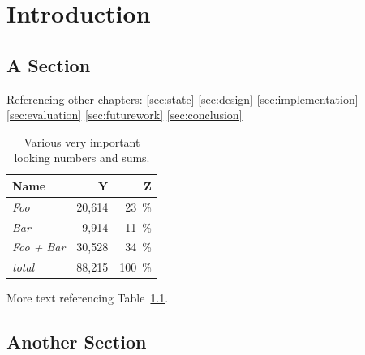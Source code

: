 \chapter{Introduction}
\label{sec:intro}





\section{A Section}

Referencing other chapters: \ref{sec:state} \ref{sec:design}
\ref{sec:implementation} \ref{sec:evaluation} \ref{sec:futurework}
\ref{sec:conclusion}

\begin{table}[htp]
  \centering
  \begin{tabular}{lrr}
    \textbf{Name} & \textbf{Y} & \textbf{Z} \\
    \hline
    \textit{Foo} & 20,614 & \SI{23}{\percent} \\
    \textit{Bar} & 9,914 & \SI{11}{\percent} \\
    \textit{Foo + Bar} & 30,528 & \SI{34}{\percent} \\
    \hline
    \textit{total} & 88,215 & \SI{100}{\percent} \\

  \end{tabular}
  \caption[Some interesting numbers]{Various very important looking numbers and sums.}
  \label{tab:numbers}
\end{table}

More text referencing Table~\ref{tab:numbers}.

\section{Another Section}

